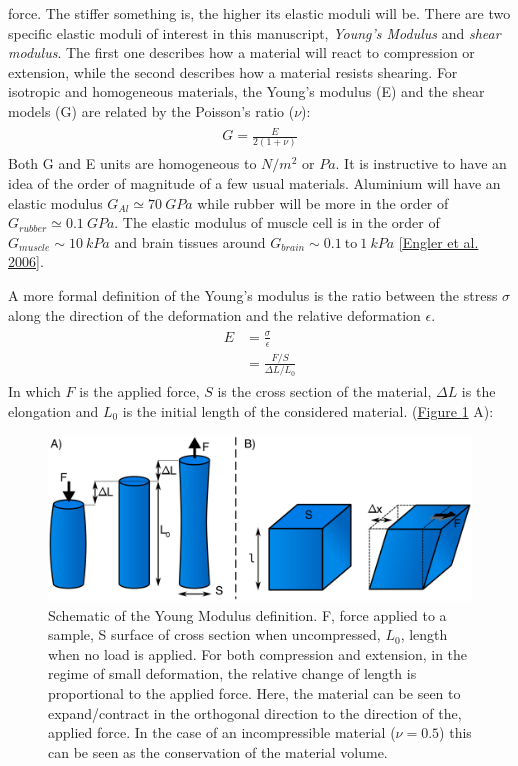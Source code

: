\documentclass[A4paperpaper,11pt,english]{sphinxmanual}
\begin{document}
force. The stiffer something is, the higher its elastic moduli will be. There
are two specific elastic moduli of interest in this
manuscript, \emph{Young's Modulus} and \emph{shear modulus}. The first one describes how a material will react to compression or extension, while the
second describes how a material resists  shearing. For isotropic and homogeneous
materials, the Young's modulus (E) and the shear models (G) are related
by the Poisson's ratio (\(\nu\)):
\label{index-latex:equation-eqa7}\begin{gather}
\begin{split}G = \frac{E}{2(1+\nu)}\end{split}\label{index-latex-eqa7}
\end{gather}
Both G and E units are homogeneous to \(N/m^2\) or
\(Pa\).  It is instructive to have an idea of the order of magnitude of a
few usual materials. Aluminium will have an elastic modulus \(G_{Al}\simeq
70~GPa\) while rubber will be more in the order of \(G_{rubber}\simeq
0.1~GPa\). The elastic modulus of muscle cell is in the order of
\(G_{muscle} \sim 10~kPa\) and brain tissues around \(G_{brain} \sim
0.1~\text{to}~1~kPa\) {\hyperref[index-latex:engler2006]{{[}Engler et al. 2006{]}}}.

A  more formal definition of the Young's modulus is the ratio between
the stress \(\sigma\) along the direction of the deformation and the relative deformation \(\epsilon\).
\label{index-latex:equation-eqa8}\begin{gather}
\begin{split}E &= \frac{\sigma}{\epsilon} \\
  & = \frac{   F/S }{   \Delta L / L_0        }\end{split}\label{index-latex-eqa8}
\end{gather}
In which \(F\) is the applied force, \(S\) is the cross section of the
material, \(\Delta L\) is the elongation and \(L_0\) is the initial
length of the considered material.  (\hyperref[index-latex:fym]{Figure  \ref*{index-latex:fym}} A):
\begin{figure}[htbp]
\centering
\capstart

\includegraphics[width=0.800\linewidth]{youngm.png}
\caption{Schematic of the Young Modulus definition. F, force applied to a sample, S
surface of cross section when uncompressed, \(L_0\), length when no load
is applied. For both compression and extension, in the regime of small
deformation, the relative change of length is proportional to the applied
force. Here, the material can be seen to expand/contract in the orthogonal direction
to the direction of the, applied force. In the case of an
incompressible material (\(\nu = 0.5\)) this can be seen as the
conservation of the material volume.}\label{index-latex:fym}\end{figure}
\end{document}

